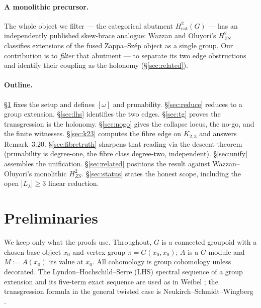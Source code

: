 \documentclass[11pt]{article}
\theoremstyle{definition}
\begin{document}
\paragraph{A monolithic precursor.} The whole object we filter --- the categorical
abutment $H^2_{\mathrm{cat}}(G)$ --- has an independently published skew-brace analogue:
Wazzan and Oluyori's $H^2_{ZS}$ \cite{oluyori} classifies extensions of the fused
Zappa--Sz\'ep object as a single group. Our contribution is to \emph{filter} that
abutment --- to separate its two edge obstructions and identify their coupling as the
holonomy (\S\ref{sec:related}).

\paragraph{Outline.} \S\ref{sec:prelim} fixes the setup and defines $[\omega]$ and
prunability. \S\ref{sec:reduce} reduces to a group extension. \S\ref{sec:lhs} identifies the
two edges. \S\ref{sec:tg} proves the transgression is the holonomy. \S\ref{sec:nogo} gives
the collapse locus, the no-go, and the finite witnesses. \S\ref{sec:k23} computes the fibre
edge on $K_{2,3}$ and answers Remark~3.20. \S\ref{sec:fibretruth} sharpens that reading via the
descent theorem (prunability is degree-one, the fibre class degree-two, independent).
\S\ref{sec:unify} assembles the unification. \S\ref{sec:related} positions the result against
Wazzan--Oluyori's monolithic $H^2_{ZS}$. \S\ref{sec:status} states the honest scope, including the
open $|L_\lambda|\ge3$ linear reduction.

\section{Preliminaries}\label{sec:prelim}

We keep only what the proofs use. Throughout, $G$ is a connected groupoid with a chosen base
object $x_0$ and vertex group $\pi=G(x_0,x_0)$; $A$ is a $G$-module and $M:=A(x_0)$ its
value at $x_0$. All cohomology is group cohomology unless decorated. The
Lyndon--Hochschild--Serre (LHS) spectral sequence of a group extension and its five-term
exact sequence are used as in Weibel \cite[\S6.8]{weibel}; the transgression formula in the
general twisted case is Neukirch--Schmidt--Wingberg \cite{nsw}.
\end{document}
